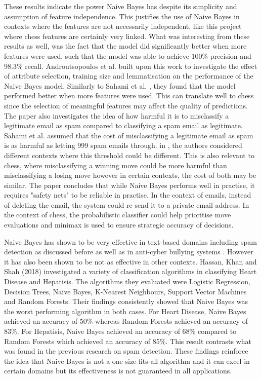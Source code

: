 These results indicate the power Naive Bayes has despite its simplicity and assumption of feature independence. This justifies the use of Naive Bayes in contexts where the features are not necessarily independent, like this project where chess features are certainly very linked. What was interesting from these results as well, was the fact that the model did significantly better when more features were used, such that the model was able to achieve 100\% precision and 98.3\% recall. Androutsopoulos et al. \cite{androutsopoulosEvaluationNaiveBayesian2000} built upon this work to investigate the effect of attribute selection, training size and lemmatisation on the performance of the Naive Bayes model. Similarly to Sahami et al. \cite{sahamiBayesianApproachFiltering} , they found that the model performed better when more features were used. This can translate well to chess since the selection of meaningful features may affect the quality of predictions. The paper also investigates the idea of how harmful it is to misclassify a legitimate email as spam compared to classifying a spam email as legitimate. Sahami et al. assumed that the cost of misclassifying a legitimate email as spam is as harmful as letting 999 spam emails through. in \cite{androutsopoulosEvaluationNaiveBayesian2000}, the authors considered different contexts where this threshold could be different. This is also relevant to chess, where misclassifying a winning move could be more harmful than misclassifying a losing move however in certain contexts, the cost of both may be similar. The paper concludes that while Naive Bayes performs well in practise, it requires "safety nets" to be reliable in practise. In the context of emails, instead of deleting the email, the system could re-send it to a private email address. In the context of chess, the probabilistic classifier could help prioritise move evaluations and minimax is used to ensure strategic accuracy of decisions. 

Naive Bayes has shown to be very effective in text-based domains including spam detection as discussed before as well as in anti-cyber bullying systems \cite{igeAIPoweredAntiCyber2022}. However it has also been shown to be not as effective in other contexts. Hassan, Khan and Shah (2018) \cite{ulhassanComparisonMachineLearning2018} investigated a variety of classification algorithms in classifying Heart Disease and Hepatisis. The algorithms they evaluated were Logistic Regression, Decision Trees, Naive Bayes, K-Nearest Neighbours, Support Vector Machines and Random Forests. Their findings consistently showed that Naive Bayes was the worst performing algorithm in both cases. For Heart Disease, Naive Bayes achieved an accuracy of 50\% whereas Random Forests achieved an accuracy of 83\%. For Hepatisis, Naive Bayes achieved an accuracy of 68\% compared to Random Forests which achieved an accuracy of 85\%. This result contrasts what was found in the previous research on spam detection. These findings reinforce the idea that Naive Bayes is not a one-size-fits-all algorithm and it can excel in certain domains but its effectiveness is not guaranteed in all applications. 

